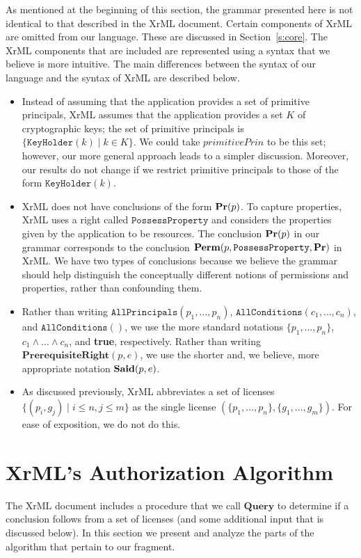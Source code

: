 \documentclass{acmtrans2m}
\newcommand{\<}{
}
\renewcommand{\>}{\rangle}
\newcommand{\Said}{\mathit{\bf Said}}
\newcommand{\Permitted}{\mathit{\bf Perm}}
\renewcommand{\Pr}{\mathit{\bf Pr}}
\newcommand{\cc}{e}
\newcommand{\allCond}{\mathtt{AllConditions}}
\newcommand{\primitivePrinc}{\mathit{primitivePrin}}
\newcommand{\keyHolder}{\mathtt{KeyHolder}}
\newcommand{\possessProperty}{\mathtt{PossessProperty}}
\newcommand{\allPrincipals}{\mathtt{AllPrincipals}}
\newcommand{\XProc}{\textbf{Query}}
\newcommand{\pred}[1]{\mathbf{#1}}
\begin{document}
As mentioned at the beginning of this section, the grammar presented
here is not
identical to that described in the XrML document.  Certain components of XrML are
omitted from our language.  These are discussed in Section~\ref{s:core}.  The XrML
components that are included are represented using a syntax that we believe is more
intuitive.  The main differences between the syntax of our language and the syntax
of XrML are described below.
\begin{itemize}
\item Instead of assuming that the application provides a set of primitive principals, XrML assumes
that the application provides a set $K$ of cryptographic keys; the set of primitive principals is
$\{\keyHolder(k)\mid k\in K\}$. We could take $\primitivePrinc$ to be this set; however, our more
general approach leads to a simpler discussion.  Moreover, our results do not change if we restrict
primitive principals to those of the form $\keyHolder(k)$.
\item XrML does not have conclusions of the form $\Pr(p)$.  To capture properties, XrML uses a right
called $\possessProperty$ and considers the properties given by the application to be resources.  The
conclusion $\Pr(p)$ in our grammar corresponds to the conclusion
$\Permitted(p, \possessProperty, \Pr)$ in XrML.  We have two types of conclusions because we believe
the grammar should help distinguish the conceptually different notions of permissions and properties,
rather than confounding them.
\item Rather than writing $\allPrincipals(p_1, \ldots, p_n)$, $\allCond(c_1, \ldots, c_n)$, and
$\allCond()$, we use the more standard notations $\{p_1, \ldots, p_n\}$, $c_1\land\ldots\land c_n$,
and {\bf true}, respectively.  Rather than writing
$\pred{PrerequisiteRight}(p, \cc)$, we use the shorter and, we believe, more appropriate notation
$\Said(p, \cc)$.
\item As discussed previously, XrML abbreviates a set of licenses
$\{(p_i, g_j) \mid i \le n, j\le m\}$ as the single license
$(\{p_1, \ldots, p_n\}, \{g_1, \ldots, g_m\})$.  For ease of exposition, we do not do this.
\end{itemize}

\section{XrML's Authorization Algorithm}\label{s:xrmlAlg}
The XrML document includes a procedure that we call $\XProc$ to determine if a conclusion follows from
a set of licenses (and some additional input that is discussed below).  In this section we present and
analyze the parts of the algorithm that pertain to our fragment.
\end{document}
